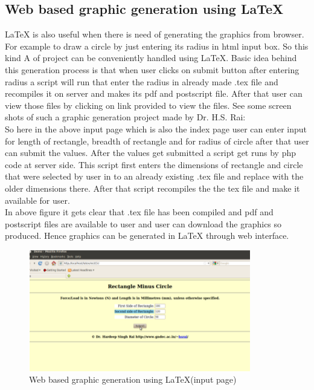 \subsection{Web based graphic generation using \LaTeX{}}
\LaTeX{} is also useful when there is need of generating the graphics from browser. For
example to draw a circle by just entering its radius in html input box. So this kind
A
of project can be conveniently handled using \LaTeX{}. Basic idea behind this generation
process is that when user clicks on submit button after entering radius a script will run
that enter the radius in already made .tex file and recompiles it on server and makes its
pdf and postscript file. After that user can view those files by clicking on link provided
to view the files. See some screen shots of such a graphic generation project made by
Dr. H.S. Rai:\\
So here in the above input page which is also the index page user can enter input
for length of rectangle, breadth of rectangle and for radius of circle after that user can submit the values. After the values get submitted a script get runs by php code at server
side. This script first enters the dimensions of rectangle and circle that were selected by
user in to an already existing .tex file and replace with the older dimensions there. After
that script recompiles the the tex file and make it available for user.\\
In above figure it gets clear that .tex file has been compiled and pdf and postscript files
are available to user and user can download the graphics so produced. Hence graphics
can be generated in \LaTeX{} through web interface.
\begin{figure}[ht]
\centering
\includegraphics[scale=0.5]{images/webgraphic.png}
\caption{Web based graphic generation using \LaTeX{}(input page)}
\end{figure}
